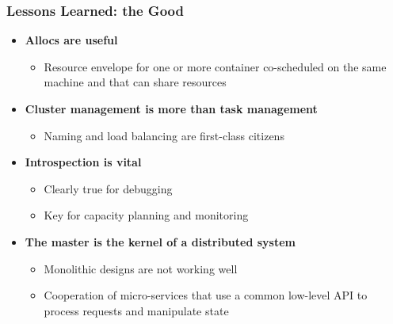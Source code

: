 \begin{frame}\frametitle{Lessons Learned: the Good}
\begin{itemize}
	\item {\bf Allocs are useful}
	\begin{itemize}
		\item Resource envelope for one or more container co-scheduled on the same machine and that can share resources
	\end{itemize}
	\item {\bf Cluster management is more than task management}
	\begin{itemize}
		\item Naming and load balancing are first-class citizens
	\end{itemize}
	\item {\bf Introspection is vital}
	\begin{itemize}
		\item Clearly true for debugging
		\item Key for capacity planning and monitoring
	\end{itemize}
	\item {\bf The master is the kernel of a distributed system}
	\begin{itemize}
		\item Monolithic designs are not working well
		\item Cooperation of micro-services that use a common low-level API to process requests and manipulate state
	\end{itemize}
\end{itemize}
\end{frame}
